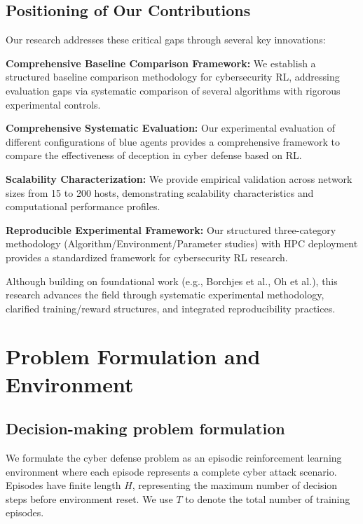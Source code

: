 \documentclass[12pt,oneside]{article}
\begin{document}
\subsection{Positioning of Our Contributions}

Our research addresses these critical gaps through several key innovations:

\textbf{Comprehensive Baseline Comparison Framework:} We establish a structured baseline comparison methodology for cybersecurity RL, addressing evaluation gaps via systematic comparison of several algorithms with rigorous experimental controls.

\textbf{Comprehensive Systematic Evaluation:} Our experimental evaluation of different configurations of blue agents provides a comprehensive framework to compare the effectiveness of deception in cyber defense based on RL.

\textbf{Scalability Characterization:} We provide empirical validation across network sizes from 15 to 200 hosts, demonstrating scalability characteristics and computational performance profiles.

\textbf{Reproducible Experimental Framework:} Our structured three-category methodology (Algorithm/Environment/Parameter studies) with HPC deployment provides a standardized framework for cybersecurity RL research.

Although building on foundational work (e.g., Borchjes et al., Oh et al.), this research advances the field through systematic experimental methodology, clarified training/reward structures, and integrated reproducibility practices.


\clearpage
\section{Problem Formulation and Environment}

\subsection{Decision-making problem formulation}

We formulate the cyber defense problem as an episodic reinforcement learning environment where each episode represents a complete cyber attack scenario. Episodes have finite length $H$, representing the maximum number of decision steps before environment reset. We use $T$ to denote the total number of training episodes.
\end{document}
